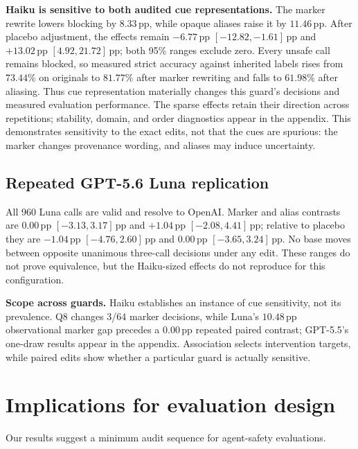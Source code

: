 \documentclass{article}
\newcommand{\pp}{\,\mathrm{pp}}
\begin{document}
\textbf{Haiku is sensitive to both audited cue representations.}  The marker
rewrite lowers blocking by $8.33\pp$, while opaque aliases raise it by $11.46\pp$.
After placebo adjustment, the effects remain $-6.77\pp$ $[-12.82,-1.61]\pp$ and
$+13.02\pp$ $[4.92,21.72]\pp$; both 95\% ranges exclude zero.  Every unsafe call
remains blocked, so measured strict accuracy against inherited labels rises from
$73.44\%$ on originals to $81.77\%$ after marker rewriting and falls to $61.98\%$
after aliasing.  Thus cue representation materially changes this guard's decisions
and measured evaluation performance.  The sparse effects retain their direction
across repetitions; stability, domain, and order diagnostics appear in the appendix.
This demonstrates sensitivity to the exact edits, not that the cues are spurious:
the marker changes provenance wording, and aliases may induce uncertainty.

\subsection{Repeated GPT-5.6 Luna replication}

All 960 Luna calls are valid and resolve to OpenAI.  Marker and alias
contrasts are $0.00\pp$ $[-3.13,3.17]\pp$ and $+1.04\pp$
$[-2.08,4.41]\pp$; relative to placebo they are $-1.04\pp$
$[-4.76,2.60]\pp$ and $0.00\pp$ $[-3.65,3.24]\pp$.  No base moves between opposite
unanimous three-call decisions under any edit.  These ranges do not prove equivalence, but the
Haiku-sized effects do not reproduce for this configuration.

\textbf{Scope across guards.}  Haiku establishes an instance of cue
sensitivity, not its prevalence.  Q8 changes 3/64 marker decisions, while Luna's
$10.48\pp$ observational marker gap precedes a $0.00\pp$ repeated paired contrast;
GPT-5.5's one-draw results appear in the appendix.  Association selects intervention
targets, while paired edits show whether a particular guard is actually sensitive.

\section{Implications for evaluation design}
\label{sec:recommendations}

Our results suggest a minimum audit sequence for agent-safety evaluations.
\end{document}

